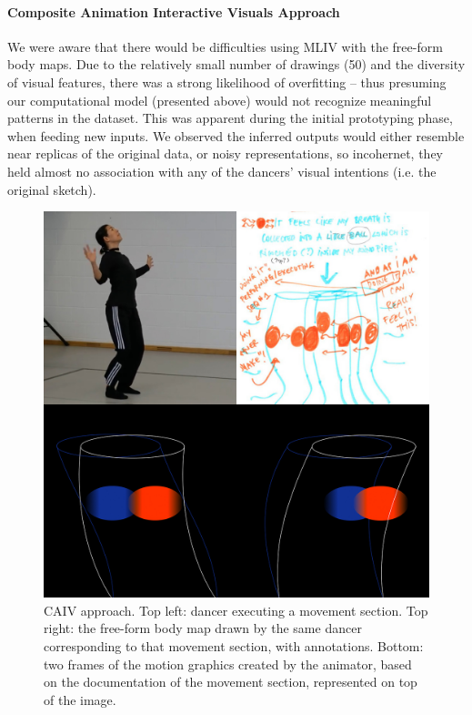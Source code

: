 

\paragraph{Composite Animation Interactive Visuals Approach}

We were aware that there would be difficulties using MLIV with the free-form body maps. Due to the relatively small number of drawings (50) and the diversity of visual features, there was a strong likelihood of overfitting – thus presuming our computational model (presented above) would not recognize meaningful patterns in the dataset. This was apparent during the initial prototyping phase, when feeding new inputs. We observed the inferred outputs would either resemble near replicas of the original data, or noisy representations, so incohernet, they held almost no association with any of the dancers’ visual intentions (i.e. the original sketch).

\begin{figure}[ht]
  \centering
  \includegraphics[width=0.65\linewidth]{Chapters/Figures/modi_dis/Stage1-animation.jpg}
  \caption[Composite Animation Approach]{CAIV approach. Top left: dancer executing a movement section. Top right: the free-form body map drawn by the same dancer corresponding to that movement section, with annotations. Bottom: two frames of the motion graphics created by the animator, based on the documentation of the movement section, represented on top of the image.}
    \label{fig:Stage1-animation}
\end{figure}

